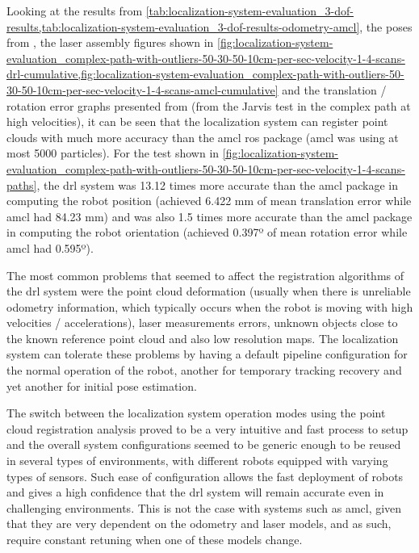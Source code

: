Looking at the results from \cref{tab:localization-system-evaluation_3-dof-results,tab:localization-system-evaluation_3-dof-results-odometry-amcl}, the poses from , the laser assembly figures shown in \cref{fig:localization-system-evaluation_complex-path-with-outliers-50-30-50-10cm-per-sec-velocity-1-4-scans-drl-cumulative,fig:localization-system-evaluation_complex-path-with-outliers-50-30-50-10cm-per-sec-velocity-1-4-scans-amcl-cumulative} and the translation / rotation error graphs presented from  (from the Jarvis test in the complex path at high velocities), it can be seen that the localization system can register point clouds with much more accuracy than the \gls{amcl} \gls{ros} package (\gls{amcl} was using at most 5000 particles). For the test shown in \cref{fig:localization-system-evaluation_complex-path-with-outliers-50-30-50-10cm-per-sec-velocity-1-4-scans-paths}, the \gls{drl} system was 13.12 times more accurate than the \gls{amcl} package in computing the robot position (achieved 6.422 mm of mean translation error while \gls{amcl} had 84.23 mm) and was also 1.5 times more accurate than the \gls{amcl} package in computing the robot orientation (achieved 0.397º of mean rotation error while \gls{amcl} had 0.595º).

The most common problems that seemed to affect the registration algorithms of the \gls{drl} system were the point cloud deformation (usually when there is unreliable odometry information, which typically occurs when the robot is moving with high velocities / accelerations), laser measurements errors, unknown objects close to the known reference point cloud and also low resolution maps. The localization system can tolerate these problems by having a default pipeline configuration for the normal operation of the robot, another for temporary tracking recovery and yet another for initial pose estimation.

The switch between the localization system operation modes using the point cloud registration analysis proved to be a very intuitive and fast process to setup and the overall system configurations seemed to be generic enough to be reused in several types of environments, with different robots equipped with varying types of sensors. Such ease of configuration allows the fast deployment of robots and gives a high confidence that the \gls{drl} system will remain accurate even in challenging environments. This is not the case with systems such as \gls{amcl}, given that they are very dependent on the odometry and laser models, and as such, require constant retuning when one of these models change.

